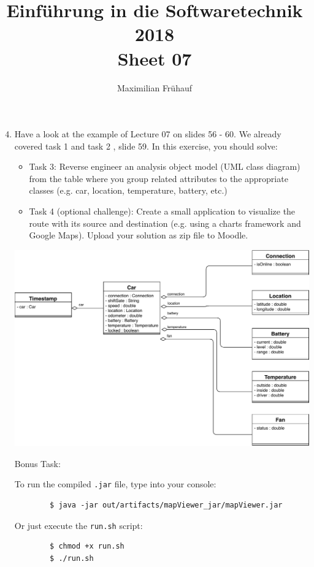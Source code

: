 \documentclass[a4paper, 10pt]{article}
\title{Einführung in die Softwaretechnik 2018 \\ Sheet 07}
\author{Maximilian Frühauf}
\begin{document}
\maketitle
\begin{enumerate}
    \setcounter{enumi}{3}
    \item
    Have a look at the example of Lecture 07 on slides 56 - 60. We already covered task 1 and task 2 , slide 59. In this exercise, you should solve:
    \begin{itemize}
        \item Task 3: Reverse engineer an analysis object model (UML class diagram) from the
    table where you group related attributes to the appropriate classes (e.g. car,
    location, temperature, battery, etc.)
        \item Task 4 (optional challenge): Create a small application to visualize the route with
    its source and destination (e.g. using a charts framework and Google Maps). Upload your solution as zip file to Moodle.
    \end{itemize}
    \vspace{0.5cm} 

    \includegraphics[width=\linewidth]{Task03.pdf}

    Bonus Task:

    To run the compiled \verb+.jar+ file, type into your console:
    \begin{verbatim}
        $ java -jar out/artifacts/mapViewer_jar/mapViewer.jar
    \end{verbatim}

    Or just execute the \verb+run.sh+ script:
    \begin{verbatim}
        $ chmod +x run.sh
        $ ./run.sh
    \end{verbatim}
\end{enumerate}
\end{document}
